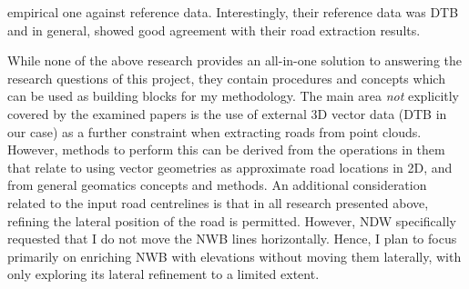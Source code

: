 empirical one against reference data. Interestingly, their reference data was DTB and in general, showed good agreement with their road extraction results.

While none of the above research provides an all-in-one solution to answering the research questions of this project, they contain procedures and concepts which can be used as building blocks for my methodology. The main area \textit{not} explicitly covered by the examined papers is the use of external 3D vector data (DTB in our case) as a further constraint when extracting roads from point clouds. However, methods to perform this can be derived from the operations in them that relate to using vector geometries as approximate road locations in 2D, and from general geomatics concepts and methods. An additional consideration related to the input road centrelines is that in all research presented above, refining the lateral position of the road is permitted. However, NDW specifically requested that I do not move the NWB lines horizontally. Hence, I plan to focus primarily on enriching NWB with elevations without moving them laterally, with only exploring its lateral refinement to a limited extent.